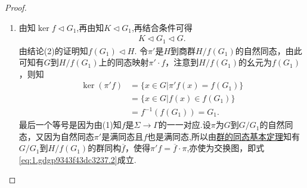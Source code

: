 \documentclass[../../main.tex]{subfiles}%
\begin{document}
\begin{proof}
\begin{enumerate}[(1)]
\item 由知$\ker f\lhd G_1$,再由知$K\lhd G_1$,再结合条件可得
\begin{align*}
K\lhd G_1\lhd G.
\end{align*}
由结论(2)的证明知$f(G_1) \lhd H$. 令$\pi'$是$H$到商群$H/f(G_1)$的自然同态，由此可知有$G$到$H/f(G_1)$上的同态映射$\pi' \cdot f$，注意到$H/f(G_1)$的幺元为$f(G_1)$，则知
\begin{align*}
\ker(\pi'f) &= \{x \in G|\pi' f(x) = f(G_1)\}\\
&= \{x \in G|f(x) \in f(G_1)\}\\
&= f^{-1}(f(G_1)) = G_1.
\end{align*}
最后一个等号是因为由(1)知$f$是$\Sigma \to \Gamma$的一一对应.设$\pi$为$G$到$G/G_1$的自然同态，又因为自然同态$\pi'$是满同态且$f$也是满同态,所以由\hyperref[theorem:群的同态基本定理]{群的同态基本定理}知有$G/G_1$到$H/f(G_1)$的群同构$\overline{f}$，使得$\pi'f=\overline{f}\cdot \pi$,亦使为交换图，即式\eqref{eq:1.gdgp9343f43dc3237.2}成立.
\begin{figure}[H]
\centering
{}
\caption{}
\label{figure:抽象代数--图1.7.2}
\end{figure}
\end{enumerate}
\end{proof}
\end{document}
